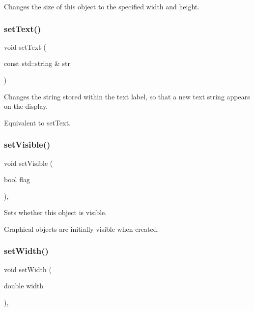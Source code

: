 Changes the size of this object to the specified width and height. 

\mbox{\label{classGText_ac98cbe102af8aaf8fd017228d645bfda}} 
\subsubsection{\texorpdfstring{set\+Text()}{setText()}}
{\footnotesize\ttfamily void set\+Text (\begin{DoxyParamCaption}\item[{const std\+::string \&}]{str }\end{DoxyParamCaption})\hspace{0.3cm}{\ttfamily [virtual]}}



Changes the string stored within the text label, so that a new text string appears on the display. 

Equivalent to set\+Text. \mbox{\label{classGObject_a88203f28224315d9f4471212f4af8ed3}} 
\subsubsection{\texorpdfstring{set\+Visible()}{setVisible()}}
{\footnotesize\ttfamily void set\+Visible (\begin{DoxyParamCaption}\item[{bool}]{flag }\end{DoxyParamCaption})\hspace{0.3cm}{\ttfamily [virtual]}, {\ttfamily [inherited]}}



Sets whether this object is visible. 

Graphical objects are initially visible when created. \mbox{\label{classGObject_aa3f3fba4cb131baa8696ba01e3bceca1}} 
\subsubsection{\texorpdfstring{set\+Width()}{setWidth()}}
{\footnotesize\ttfamily void set\+Width (\begin{DoxyParamCaption}\item[{double}]{width }\end{DoxyParamCaption})\hspace{0.3cm}{\ttfamily [virtual]}, {\ttfamily [inherited]}}



